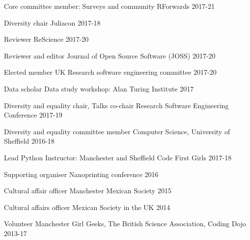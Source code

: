 \begin{cvpress}
\cvpres
{Core committee member: Surveys and community} %
{RForwards}
{2017-21} %

\cvpres
{Diversity chair} %
{Juliacon} %
{2017-18} %

\cvpres
{Reviewer} %
{ReScience} %
{2017-20} %


\cvpres
{Reviewer and editor} %
{Journal of Open Source Software (JOSS)} %
{2017-20} %



\cvpres
{Elected member} %
{UK Research software engineering committee} %
{2017-20} %

\cvpres
{Data scholar} %
{Data study workshop: Alan Turing Institute} %
{2017} %


\cvpres
{Diversity and equality chair, Talks co-chair} %
{Research Software Engineering Conference} %
{2017-19} %


\cvpres
{Diversity and equality committee member} %
{Computer Science, University of Sheffield} %
{2016-18} %


\cvpres
{Lead Python Instructor: Manchester and Sheffield} %
{Code First Girls} %
{2017-18} %



\cvpres
{Supporting organiser} %
{Nanoprinting conference} %
{2016} %


\cvpres
{Cultural affair officer}
{Manchester Mexican Society}
{2015}

\cvpres
{Cultural affairs officer}
{Mexican Society in the UK}
{2014}


\cvpres
{Volunteer} %
{Manchester Girl Geeks, The British Science Association, Coding Dojo} %
{2013-17} %


\end{cvpress}